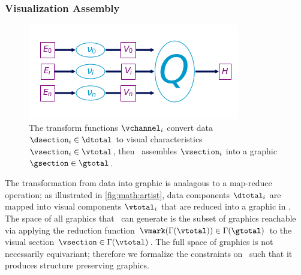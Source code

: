 \documentclass[../main.tex]{subfiles}
\begin{document}
\subsubsection{Visualization Assembly}
\label{sec:math:artist:q}
\begin{figure}[htb]
  \centering
  \includegraphics[width=\textwidth]{figures/math/path_of_q.png}
  \caption{The transform functions $\vchannel_i$ convert data $\dsection_i\in \dtotal$ to visual characteristics $\vsection_i \in \vtotal$, then \vmark\ assembles $\vsection_i$ into a graphic $\gsection \in \gtotal$.} 
  \label{fig:math:artist:q}
\end{figure}
The transformation from data into graphic is analagous to a map-reduce operation; as illustrated in \autoref{fig:math:artist}, data components $\dtotal_{i}$ are mapped into visual components $\vtotal_{i}$ that are reduced into a graphic in \gtotal. The space of all graphics that \vmark\ can generate is the subset of graphics reachable via applying the reduction function $\vmark(\Gamma(\vtotal)) \in \Gamma(\gtotal)$ to the visual section $\vsection \in \Gamma(\vtotal)$. The full space of graphics is not necessarily equivariant; therefore we formalize the constraints on \vmark\ such that it produces structure preserving graphics. 
\end{document}
